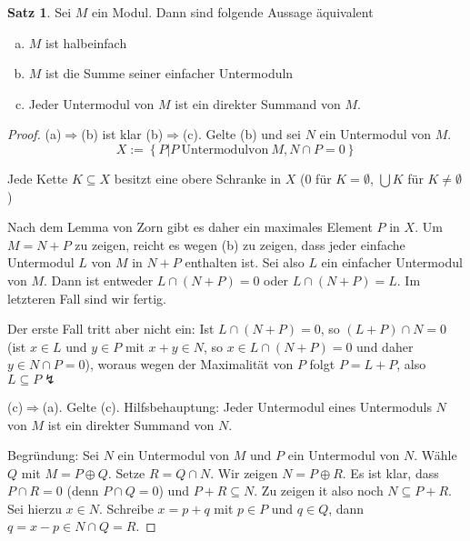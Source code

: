 \documentclass[
twoside=semi,
fontsize=12,
DIV=12, 
cleardoublepage=current,
leqno,
headings=optiontoheadandtoc, 
toc=idx
]{scrbook}
\newcommand{\set}[1]{\left\{ #1 \right\}}
\theoremstyle{definition}
\newtheorem{satz}[definition]{Satz}
\begin{document}
	\begin{satz}\label{1.3.10}
		Sei $M$ ein Modul. Dann sind folgende Aussage \"aquivalent
		\begin{enumerate}[(a)]
			\item $M$ ist halbeinfach
			
			\item $M$ ist die Summe seiner einfacher Untermoduln
			
			\item Jeder Untermodul von $M$ ist ein direkter Summand von $M$.
		\end{enumerate}	
		
		\begin{proof}\hfill\newline
			(a)$\Rightarrow$(b) ist klar\newline
			(b)$\Rightarrow$(c). Gelte (b) und sei $N$ ein Untermodul von $M$.
				\[X:= \set{P| P \ \mathrm{Untermodul von }\ M, N \cap P = 0}\]
			
			\noindent Jede Kette $K \subseteq X$ besitzt eine obere Schranke in $X$ ($0$ f\"ur $K = \emptyset$, $\bigcup K$ f\"ur $K \neq \emptyset$)
			
			\noindent Nach dem Lemma von Zorn gibt es daher ein maximales Element $P$ in $X$. Um $M = N + P$ zu zeigen, reicht es wegen (b) zu zeigen, dass jeder einfache Untermodul $L$ von $M$ in $N + P$ enthalten ist. Sei also $L$ ein einfacher Untermodul von $M$. Dann ist entweder $L \cap (N + P) = 0$ oder $L \cap (N + P) = L$. Im letzteren Fall sind wir fertig.
			
			\noindent Der erste Fall tritt aber nicht ein:\newline
			Ist $L \cap (N+P) = 0$, so $(L+P)\cap N = 0$ (ist $x \in L$ und $y \in P$ mit $x+y \in N$, so $x \in L\cap (N+P) = 0$ und daher $y \in N\cap P = 0$), woraus wegen der Maximalit\"at von $P$ folgt $P = L + P$, also $L \subseteq P \lightning$
			
			
			\noindent (c)$\Rightarrow$(a). Gelte (c).\newline
			Hilfsbehauptung: Jeder Untermodul eines Untermoduls $N$ von $M$ ist ein direkter Summand von $N$.
			
			\noindent Begr\"undung: Sei $N$ ein Untermodul von $M$ und $P$ ein Untermodul von $N$.
			W\"ahle $Q$ mit $M = P \oplus Q$. Setze $R = Q \cap N$. Wir zeigen $N = P \oplus R$. Es ist klar, dass $P \cap R = 0$ (denn $P \cap Q = 0$) und $P + R \subseteq N$. Zu zeigen it also noch $N \subseteq P + R$. \newline
			Sei hierzu $x \in N$. Schreibe $x = p + q$ mit $p \in P$ und $q \in Q$, dann $q = x - p \in N \cap Q = R$.  
			

\end{proof}
\end{satz}
\end{document}
